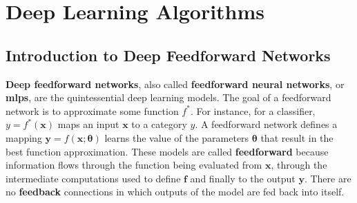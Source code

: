 \section{Deep Learning Algorithms}
\subsection{Introduction to Deep Feedforward Networks}
\textbf{Deep feedforward networks}, also called \textbf{feedforward neural
networks}, or \textbf{\glspl{mlp}}, are the quintessential
deep learning models. The goal of a feedforward network is to approximate some
function $f^*$. For instance, for a classifier, $y=f^*(\boldsymbol{x})$ maps an
input $\boldsymbol{x}$ to a category $y$. A feedforward network defines a
mapping $\boldsymbol{y} = f(\boldsymbol{x};\boldsymbol{\theta})$ learns the
value of the parameters $\boldsymbol{\theta}$ that result in the best function
approximation. These models are called \textbf{feedforward} because information
flows through the function being evaluated from $\boldsymbol{x}$, through the
intermediate computations used to define $\boldsymbol{f}$ and finally to the
output $\boldsymbol{y}$. There are no \textbf{feedback} connections in which
outputs of the model are fed back into itself.


